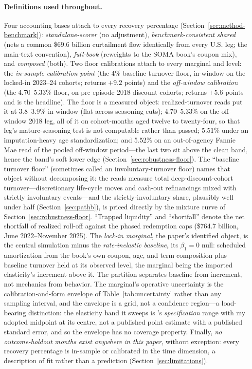 \paragraph{Definitions used throughout.} Four accounting bases attach to every recovery percentage (Section~\ref{sec:method-benchmark}): \emph{standalone-scorer} (no adjustment), \emph{benchmark-consistent shared} (nets a common \$69.6 billion curtailment flow identically from every U.S. leg; the main-text convention), \emph{full-book} (reweights to the SOMA book's coupon mix), and \emph{composed} (both). Two floor calibrations attach to every marginal and level: the \emph{in-sample calibration point} (the 4\% baseline turnover floor, in-window on the locked-in 2023--24 cohorts; returns $+9.2$ points) and the \emph{off-window calibration} (the 4.70--5.33\% floor, on pre-episode 2018 discount cohorts; returns $+5.6$ points and is the headline). The floor is a measured object: realized-turnover reads put it at 3.8--3.9\% in-window (flat across seasoning cuts); 4.70--5.33\% on the off-window 2018 leg, all of it on cohort-months aged twelve to twenty-four, so that leg's mature-seasoning test is not computable rather than passed; 5.51\% under an imputation-heavy age standardization; and 5.52\% on an out-of-agency Fannie Mae read of the pooled off-window period---the last two sit above the clean band, hence the band's soft lower edge (Section~\ref{sec:robustness-floor}). The ``baseline turnover floor'' (sometimes called an involuntary-turnover floor) names that object without decomposing it: the reads measure total deep-discount-cohort turnover---discretionary life-cycle moves and cash-out refinancings mixed with strictly involuntary events---and the strictly-involuntary share, plausibly well under half (Section~\ref{sec:pathb}), is priced directly by the mixture curve of Section~\ref{sec:robustness-floor}. ``Trapped liquidity'' and ``shortfall'' denote the net shortfall of realized roll-off against the phased redemption caps (\$764.7 billion, June 2022--November 2025). The \emph{lock-in marginal}, the paper's identified object, is the central simulation minus the \emph{rate-inelastic baseline}, its $\beta_1 = 0$ null: scheduled amortization from the book's own coupon, age, and term composition plus baseline turnover held at its observed level, the marginal being the imported elasticity's increment above it. The partition separates baseline from increment, not mechanics from behavior. The marginal's operative uncertainty is the calibration-and-form envelope of Table~\ref{tab:uncertainty} rather than any sampling interval, and the envelope is a grid, not a confidence region---a load-bearing distinction: the elasticity band it sweeps is \citeauthor{liebersohn2024}'s \emph{specification} range with my adopted midpoint at its centre, not a published point estimate with a published standard error, and so the envelope has no coverage property. Finally, \emph{no outcome-holdout months exist anywhere in this paper}, without exception: every recovery percentage is in-sample or calibrated in the time dimension, a description of fit rather than a prediction (Section~\ref{sec:limitations}).
